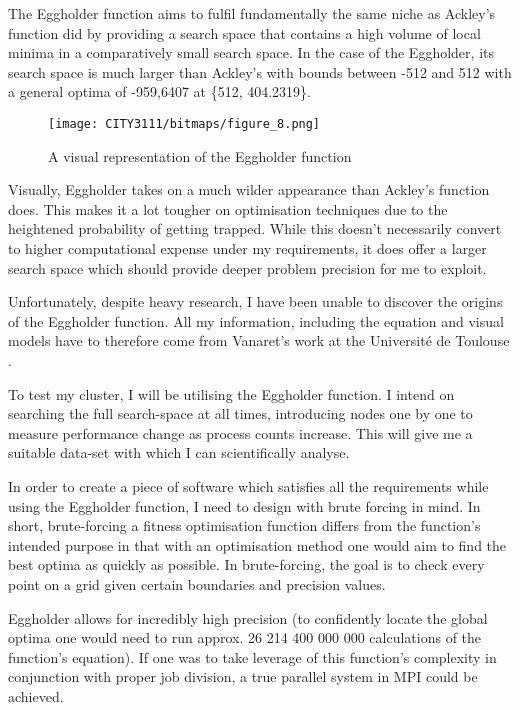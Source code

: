 The Eggholder function aims to fulfil fundamentally the same niche as Ackley's function did by providing a search space that contains a high volume of local minima in a comparatively small search space. In the case of the Eggholder, its search space is much larger than Ackley's with bounds between -512 and 512 with a general optima of -959{,}6407 at \{512, 404.2319\}.

\begin{figure}[H]
    \texttt{[image: CITY3111/bitmaps/figure\_8.png]}
    \caption{A visual representation of the Eggholder function \cite{surjanovic2_2017}}
    \label{figure_8}
\end{figure}

Visually, Eggholder takes on a much wilder appearance than Ackley's function does. This makes it a lot tougher on optimisation techniques due to the heightened probability of getting trapped. While this doesn't necessarily convert to higher computational expense under my requirements, it does offer a larger search space which should provide deeper problem precision for me to exploit.

Unfortunately, despite heavy research, I have been unable to discover the origins of the Eggholder function. All my information, including the equation and visual models have to therefore come from Vanaret's work at the Université de Toulouse \cite{vanaret_2015}.

To test my cluster, I will be utilising the Eggholder function. I intend on searching the full search-space at all times, introducing nodes one by one to measure performance change as process counts increase. This will give me a suitable data-set with which I can scientifically analyse.

\textbf{}

In order to create a piece of software which satisfies all the requirements while using the Eggholder function, I need to design with brute forcing in mind. In short, brute-forcing a fitness optimisation function differs from the function's intended purpose in that with an optimisation method one would aim to find the best optima as quickly as possible. In brute-forcing, the goal is to check every point on a grid given certain boundaries and precision values.

Eggholder allows for incredibly high precision (to confidently locate the global optima one would need to run approx. 26 214 400 000 000 calculations of the function's equation). If one was to take leverage of this function's complexity in conjunction with proper job division, a true parallel system in MPI could be achieved.

